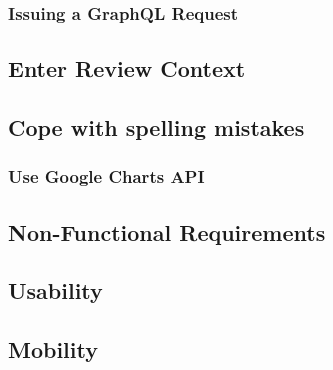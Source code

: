 \subsubsection{Issuing a GraphQL Request}

\subsection{Enter Review Context}

\subsection{Cope with spelling mistakes}

\subsubsection{Use Google Charts API}

\subsubsection{}

\subsection{Non-Functional Requirements}

\subsection{Usability}

\subsection{Mobility}


